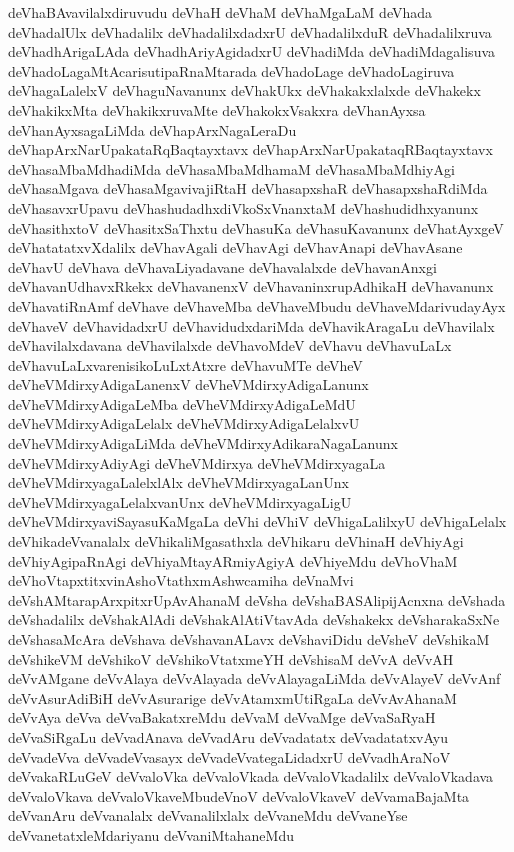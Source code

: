 {deVhaBAvavilalxdiruvudu
deVhaH
deVhaM
deVhaMgaLaM
deVhada
deVhadalUlx
deVhadalilx
deVhadalilxdadxrU
deVhadalilxduR
deVhadalilxruva
deVhadhArigaLAda
deVhadhAriyAgidadxrU
deVhadiMda
deVhadiMdagalisuva
deVhadoLagaMtAcarisutipaRnaMtarada
deVhadoLage
deVhadoLagiruva
deVhagaLalelxV
deVhaguNavanunx
deVhakUkx
deVhakakxlalxde
deVhakekx
deVhakikxMta
deVhakikxruvaMte
deVhakokxVsakxra
deVhanAyxsa
deVhanAyxsagaLiMda
deVhapArxNagaLeraDu
deVhapArxNarUpakataRqBaqtayxtavx
deVhapArxNarUpakataqRBaqtayxtavx
deVhasaMbaMdhadiMda
deVhasaMbaMdhamaM
deVhasaMbaMdhiyAgi
deVhasaMgava
deVhasaMgavivajiRtaH
deVhasapxshaR
deVhasapxshaRdiMda
deVhasavxrUpavu
deVhashudadhxdiVkoSxVnanxtaM
deVhashudidhxyanunx
deVhasithxtoV
deVhasitxSaThxtu
deVhasuKa
deVhasuKavanunx
deVhatAyxgeV
deVhatatatxvXdalilx
deVhavAgali
deVhavAgi
deVhavAnapi
deVhavAsane
deVhavU
deVhava
deVhavaLiyadavane
deVhavalalxde
deVhavanAnxgi
deVhavanUdhavxRkekx
deVhavanenxV
deVhavaninxrupAdhikaH
deVhavanunx
deVhavatiRnAmf
deVhave
deVhaveMba
deVhaveMbudu
deVhaveMdarivudayAyx
deVhaveV
deVhavidadxrU
deVhavidudxdariMda
deVhavikAragaLu
deVhavilalx
deVhavilalxdavana
deVhavilalxde
deVhavoMdeV
deVhavu
deVhavuLaLx
deVhavuLaLxvarenisikoLuLxtAtxre
deVhavuMTe
deVheV
deVheVMdirxyAdigaLanenxV
deVheVMdirxyAdigaLanunx
deVheVMdirxyAdigaLeMba
deVheVMdirxyAdigaLeMdU
deVheVMdirxyAdigaLelalx
deVheVMdirxyAdigaLelalxvU
deVheVMdirxyAdigaLiMda
deVheVMdirxyAdikaraNagaLanunx
deVheVMdirxyAdiyAgi
deVheVMdirxya
deVheVMdirxyagaLa
deVheVMdirxyagaLalelxlAlx
deVheVMdirxyagaLanUnx
deVheVMdirxyagaLelalxvanUnx
deVheVMdirxyagaLigU
deVheVMdirxyaviSayasuKaMgaLa
deVhi
deVhiV
deVhigaLalilxyU
deVhigaLelalx
deVhikadeVvanalalx
deVhikaliMgasathxla
deVhikaru
deVhinaH
deVhiyAgi
deVhiyAgipaRnAgi
deVhiyaMtayARmiyAgiyA
deVhiyeMdu
deVhoVhaM
deVhoVtapxtitxvinAshoVtathxmAshwcamiha
deVnaMvi
deVshAMtarapArxpitxrUpAvAhanaM
deVsha
deVshaBASAlipijAcnxna
deVshada
deVshadalilx
deVshakAlAdi
deVshakAlAtiVtavAda
deVshakekx
deVsharakaSxNe
deVshasaMcAra
deVshava
deVshavanALavx
deVshaviDidu
deVsheV
deVshikaM
deVshikeVM
deVshikoV
deVshikoVtatxmeYH
deVshisaM
deVvA
deVvAH
deVvAMgane
deVvAlaya
deVvAlayada
deVvAlayagaLiMda
deVvAlayeV
deVvAnf
deVvAsurAdiBiH
deVvAsurarige
deVvAtamxmUtiRgaLa
deVvAvAhanaM
deVvAya
deVva
deVvaBakatxreMdu
deVvaM
deVvaMge
deVvaSaRyaH
deVvaSiRgaLu
deVvadAnava
deVvadAru
deVvadatatx
deVvadatatxvAyu
deVvadeVva
deVvadeVvasayx
deVvadeVvategaLidadxrU
deVvadhAraNoV
deVvakaRLuGeV
deVvaloVka
deVvaloVkada
deVvaloVkadalilx
deVvaloVkadava
deVvaloVkava
deVvaloVkaveMbudeVnoV
deVvaloVkaveV
deVvamaBajaMta
deVvanAru
deVvanalalx
deVvanalilxlalx
deVvaneMdu
deVvaneYse
deVvanetatxleMdariyanu
deVvaniMtahaneMdu
}
